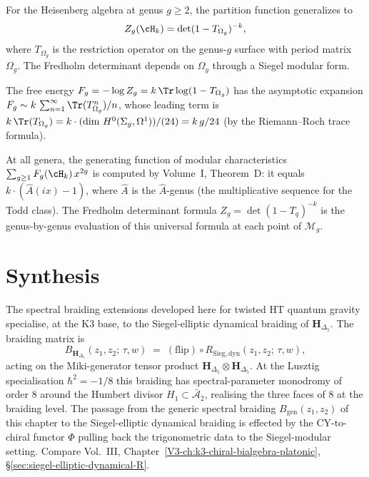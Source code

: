 \begin{remark}
For the Heisenberg algebra at genus $g \ge 2$, the partition function
generalizes to
\[
Z_g(\cH_k) = \det(1 - T_{\Omega_g})^{-k},
\]
where $T_{\Omega_g}$ is the restriction operator on the genus-$g$
surface with period matrix $\Omega_g$. The Fredholm determinant
depends on $\Omega_g$ through a Siegel modular form.

The free energy $F_g = -\log Z_g = k\, \Tr\log(1 - T_{\Omega_g})$
has the asymptotic expansion
$F_g \sim k\, \sum_{n=1}^\infty \Tr(T_{\Omega_g}^n)/n$,
whose leading term is $k\, \Tr(T_{\Omega_g}) = k \cdot
(\text{dim }H^0(\Sigma_g, \Omega^1))/(24) = k\,g/24$
(by the Riemann--Roch trace formula).

At all genera, the generating function of modular characteristics
$\sum_{g \ge 1} F_g(\cH_k)\, x^{2g}$ is computed by
Volume~I, Theorem~D: it equals $k \cdot (\hat{A}(ix) - 1)$,
where $\hat{A}$ is the $\hat{A}$-genus (the multiplicative
sequence for the Todd class). The Fredholm determinant formula
$Z_g = \det(1-T_q)^{-k}$ is the genus-by-genus evaluation of
this universal formula at each point of $\mathcal{M}_g$.
\end{remark}

\section{Synthesis}
\label{sec:specbraid-ext-supplement}

\begin{remark}
\label{rem:specbraid-ext-1}
The spectral braiding extensions developed here for twisted HT quantum
gravity specialise, at the K3 base, to the Siegel-elliptic
dynamical braiding of $\mathbf H_{\Delta_5}$. The braiding matrix is
\[
B_{\mathbf H_{\Delta_5}}(z_1, z_2;\, \tau, w) \;=\; (\mathrm{flip}) \circ R_{\mathrm{Sieg,dyn}}(z_1, z_2;\, \tau, w),
\]
acting on the Miki-generator tensor product
$\mathbf H_{\Delta_5}\otimes\mathbf H_{\Delta_5}$. At the Lusztig
specialisation $\hbar^2 = -1/8$ this braiding has spectral-parameter
monodromy of order $8$ around the Humbert divisor $H_1\subset\bar{\mathcal A}_2$,
realising the three faces of $8$ at the braiding level. The passage from
the generic spectral braiding $B_{\mathrm{gen}}(z_1,z_2)$ of this chapter
to the Siegel-elliptic dynamical braiding is effected by the
CY-to-chiral functor $\Phi$ pulling back the trigonometric data to the
Siegel-modular setting. Compare Vol.~III,
Chapter~\ref{V3-ch:k3-chiral-bialgebra-platonic},
\S\ref{sec:siegel-elliptic-dynamical-R}.
\end{remark}
